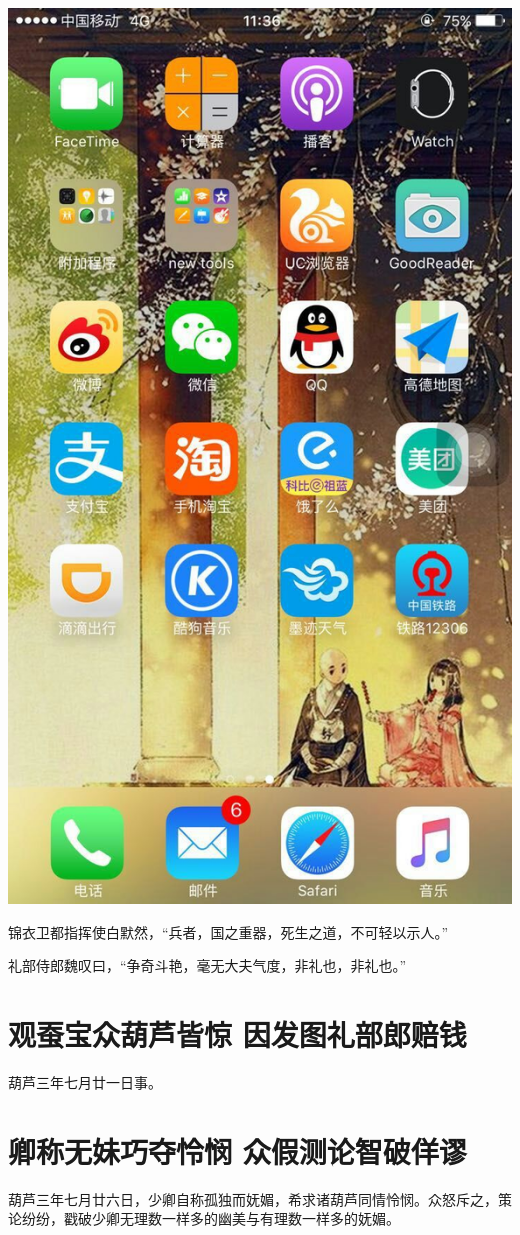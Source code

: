 \documentclass[12pt, a4paper]{book}
\begin{document}
\begin{CJK}{UTF8}{gbsn}
    \begin{center}
    \includegraphics[height=0.3\textheight]{./figure/desktop-6.jpg}
    \end{center}

    锦衣卫都指挥使白默然，“兵者，国之重器，死生之道，不可轻以示人。”

    礼部侍郎魏叹曰，“争奇斗艳，毫无大夫气度，非礼也，非礼也。”

    \chapter{观蚕宝众葫芦皆惊 因发图礼部郎赔钱}
    
    葫芦三年七月廿一日事。
    
    \chapter{卿称无妹巧夺怜悯 众假测论智破佯谬}
    
    葫芦三年七月廿六日，少卿自称孤独而妩媚，希求诸葫芦同情怜悯。众怒斥之，策论纷纷，戳破少卿无理数一样多的幽美与有理数一样多的妩媚。

    \appendix

    

\end{CJK}
\end{document}
